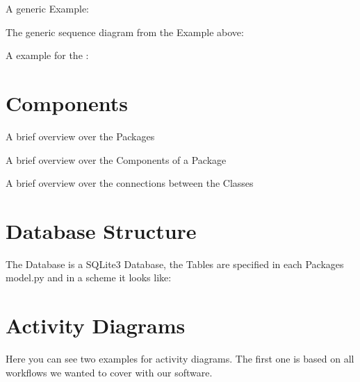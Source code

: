 \documentclass[letterpaper,10pt,english]{sphinxmanual}
\begin{document}
A generic Example:


The generic sequence diagram from the Example above:


A example for the :



\section{Components}
\label{\detokenize{masterDeveloperDoc:components}}
A brief overview over the Packages


A brief overview over the Components of a Package


A brief overview over the connections between the Classes



\section{Database Structure}
\label{\detokenize{masterDeveloperDoc:database-structure}}
The Database is a SQLite3 Database, the Tables are specified in each Packages
model.py and in a scheme it looks like:



\section{Activity Diagrams}
\label{\detokenize{masterDeveloperDoc:activity-diagrams}}
Here you can see two examples for activity diagrams. The first one is based
on all workflows we wanted to cover with our software.
\end{document}
